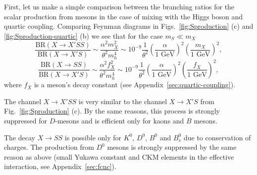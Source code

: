 \documentclass[a4paper,12pt,dvipsnames,usernames]{article}
\begin{document}
First, let us make a simple comparison between the branching ratios for the scalar production from mesons in the case of mixing with the Higgs boson and quartic coupling. Comparing Feynman diagrams in Figs.~\ref{fig:Sproduction} (c) and \ref{fig:Sproduction-quartic} (b) we see that for the case $m_S\ll m_X$
\begin{equation}
    \frac{\text{BR}(X\to X'SS)}{\text{BR}(X\to X'S)} \sim \frac{\alpha^2 m_X^2}{\theta^2 m_h^4} \sim 10^{-9} \frac{1}{\theta^2} \left(\frac{\alpha}{1\text{ GeV}}\right)^{2}
    \left(\frac{m_X}{1\text{ GeV}}\right)^{2},
    \label{eq:quartic-to-mixing1}
\end{equation}
\begin{equation}
    \frac{\text{BR}(X\to SS)}{\text{BR}(X\to X'S)} \sim \frac{\alpha^2 f_X^2}{\theta^2 m_h^4} \sim 10^{-9} \frac{1}{\theta^2} \left(\frac{\alpha}{1\text{ GeV}}\right)^{2}
    \left(\frac{f_X}{1\text{ GeV}}\right)^{2},
    \label{eq:quartic-to-mixing2}
\end{equation}
where $f_X$ is a meson's decay constant (see Appendix~\ref{sec:quartic-coupling}). 

The channel $X\to X'SS$ is very similar to the channel $X\to X'S$ from Fig.~\ref{fig:Sproduction} (c). By the same reasons, this process is strongly suppressed for $D$-mesons and is efficient only for kaons and  $B$ mesons.
 
The decay $X\to SS$ is possible only for $K^0$, $D^0$, $B^0$ and $B^0_s$ due to conservation of charges. The production from $D^0$ mesons is strongly suppressed by the same reason as above (small Yukawa constant and CKM elements in the effective interaction, see Appendix~\ref{sec:fcnc}).
\end{document}
